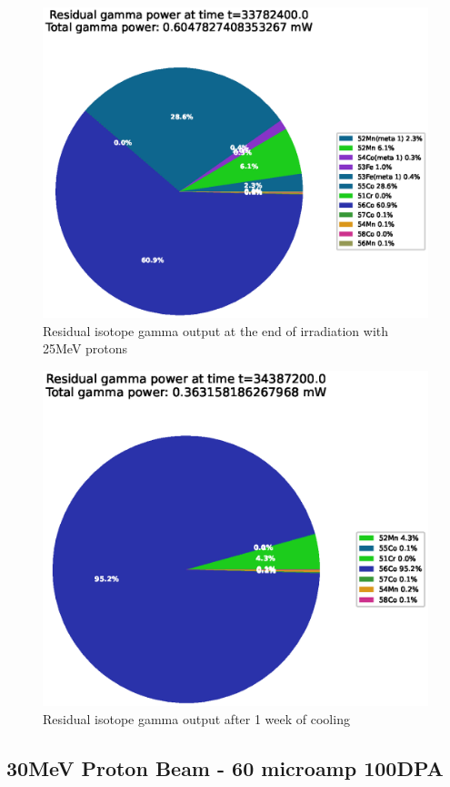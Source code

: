 \begin{figure}[!htb]
\centering
\includegraphics[width=0.7\linewidth]{chapters/activity_code/fe_100dpa/endofbeam/25MeV_0400_33782400.eps}
\caption{Residual isotope gamma output at the end of irradiation with 25MeV protons}
\label{fig:25mev-proton-100dpa}
\end{figure}

\begin{figure}[!htb]
\centering
\includegraphics[width=0.7\linewidth]{chapters/activity_code/fe_100dpa/endofbeam/25MeV_0500_34387200.eps}
\caption{Residual isotope gamma output after 1 week of cooling}
\label{fig:25mev-proton-100dpa}
\end{figure}



\clearpage
\FloatBarrier
\subsection{30MeV Proton Beam - 60 microamp 100DPA}

